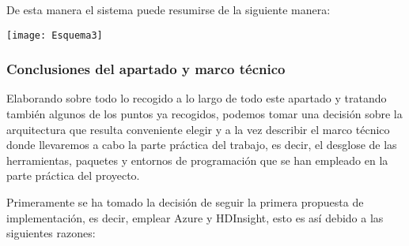 \documentclass[11pt, a4paper]{article} %
\begin{document}
De esta manera el sistema puede resumirse de la siguiente manera:


\texttt{[image: Esquema3]}
\subsubsection{Conclusiones del apartado y marco técnico}
Elaborando sobre todo lo recogido a lo largo de todo este apartado y tratando también algunos de los puntos ya recogidos, podemos tomar una decisión sobre la arquitectura que resulta conveniente elegir y a la vez describir el marco técnico donde llevaremos a cabo la parte práctica del trabajo, es decir, el desglose de las herramientas, paquetes y entornos de programación que se han empleado en la parte práctica del proyecto.


Primeramente se ha tomado la decisión de seguir la primera propuesta de implementación, es decir, emplear Azure y HDInsight, esto es así debido a las siguientes razones:
\end{document}

